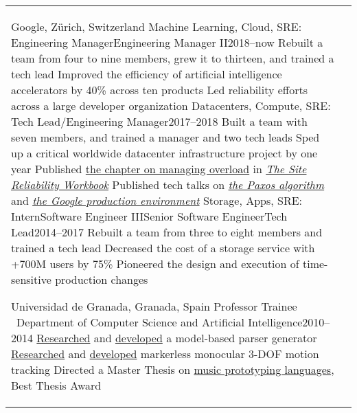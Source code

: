 \documentclass[letterpaper,10pt,oneside]{article}
\newcommand{\DatestampY}[1]{#1}
\newenvironment{body}
{\par\par
\begin{longtable}{p{0.142\textwidth}p{0.807\textwidth}}}
{\par\end{longtable}\par}
\newcommand{\SmallEntryGap}{\par\vspace{0.1em}\par}
\begin{document}
\begin{body}
Google, Z\"urich, Switzerland\newline
\phantom{w}Machine Learning, Cloud, SRE: Engineering Manager\textrightarrow Engineering Manager II\hfill \DatestampY{2018}--now\setlength{\dimen0}{\widthof{now}}\hspace{-\dimen0}\hphantom{\DatestampY{2000}} \newline
\phantom{ww}Rebuilt a team from four to nine members, grew it to thirteen, and trained a tech lead\newline
\phantom{ww}Improved the efficiency of artificial intelligence accelerators by 40\% across ten products\newline
\phantom{ww}Led reliability efforts across a large developer organization\newline
\phantom{w}Datacenters, Compute, SRE: Tech Lead/Engineering Manager\hfill \DatestampY{2017}--\DatestampY{2018} \newline
\phantom{ww}Built a team with seven members, and trained a manager and two tech leads\newline
\phantom{ww}Sped up a critical worldwide datacenter infrastructure project by one year\newline
\phantom{ww}Published \href{https://landing.google.com/sre/workbook/chapters/overload/}{the chapter on managing overload} in \textit{\href{https://landing.google.com/sre/books/}{The Site Reliability Workbook}}\newline
\phantom{ww}Published tech talks on \textit{\href{https://youtu.be/d7nAGI_NZPk}{the Paxos algorithm}} and \textit{\href{https://youtu.be/dhTVVWzpc4Q}{the Google production environment}}\newline
\phantom{w}Storage, Apps, SRE: Intern\textrightarrow Software Engineer III\textrightarrow Senior Software Engineer\textrightarrow Tech Lead\hfill \DatestampY{2014}--\DatestampY{2017} \newline
\phantom{ww}Rebuilt a team from three to eight members and trained a tech lead\newline
\phantom{ww}Decreased the cost of a storage service with +700M users by 75\%\newline
\phantom{ww}Pioneered the design and execution of time-sensitive production changes

\SmallEntryGap

Universidad de Granada, Granada, Spain\newline
\phantom{w}Professor Trainee \textendash\ Department of Computer Science and Artificial Intelligence\hfill \DatestampY{2010}--\DatestampY{2014} \newline
\phantom{ww}\href{https://doi.org/10.1142/S0218194014500375}{Researched} and \href{https://github.com/lquesada/ModelCC}{developed} a model-based parser generator \newline
\phantom{ww}\href{https://doi.org/10.1142/S0129065712500190}{Researched} and \href{https://github.com/lquesada/MotionTracking}{developed} markerless monocular 3-DOF motion tracking \newline
\phantom{ww}Directed a Master Thesis on \href{https://github.com/lquesada/ADAgio}{music prototyping languages}, Best Thesis Award


\end{body}
\end{document}
